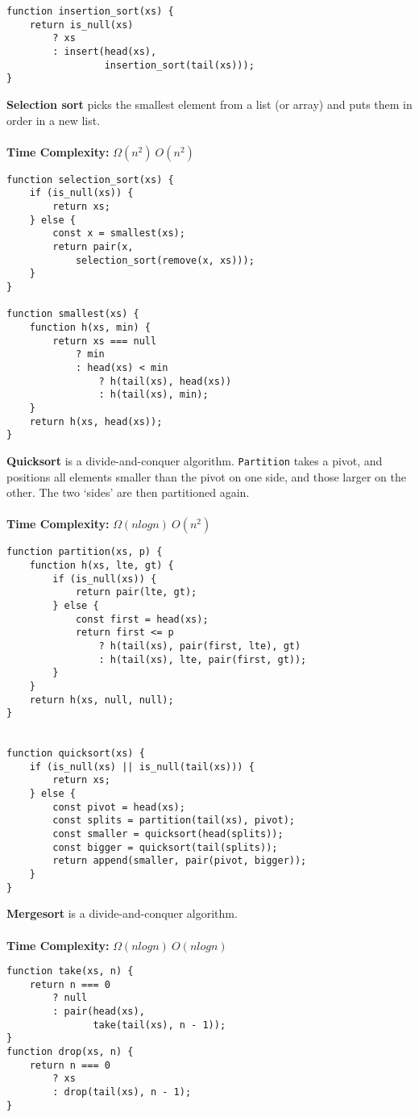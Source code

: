 \documentclass[a4paper]{article} \usepackage[backend=biber, style=numeric, sorting=none]{biblatex}
\begin{document}
\begin{multicols*}{4}
\begin{verbatim}
function insertion_sort(xs) {
    return is_null(xs)
        ? xs
        : insert(head(xs),
                 insertion_sort(tail(xs)));
}
\end{verbatim}

{\small\textbf{Selection sort}} picks the smallest element from a list (or array) and puts them in order in a new list.
\\ \\
\textbf{Time Complexity:} $\Omega(n^{2})\ O(n^{2})$
\begin{verbatim}
function selection_sort(xs) {
    if (is_null(xs)) {
        return xs;
    } else {
        const x = smallest(xs);
        return pair(x,
            selection_sort(remove(x, xs)));
    }
}

function smallest(xs) {
    function h(xs, min) {
        return xs === null
            ? min
            : head(xs) < min
                ? h(tail(xs), head(xs))
                : h(tail(xs), min);
    }
    return h(xs, head(xs));
}
\end{verbatim}
\vfill\null
\columnbreak
{\small\textbf{Quicksort}} is a divide-and-conquer algorithm. \texttt{Partition} takes a pivot, and positions all elements smaller than the pivot on one side, and those larger on the other. The two `sides' are then partitioned again.
\\ \\
\textbf{Time Complexity:} $\Omega(n log n)\ O(n^{2})$
\begin{verbatim}
function partition(xs, p) {
    function h(xs, lte, gt) {
        if (is_null(xs)) {
            return pair(lte, gt);
        } else {
            const first = head(xs);
            return first <= p
                ? h(tail(xs), pair(first, lte), gt)
                : h(tail(xs), lte, pair(first, gt));
        }
    }
    return h(xs, null, null);
}


function quicksort(xs) {
    if (is_null(xs) || is_null(tail(xs))) {
        return xs;
    } else {
        const pivot = head(xs);
        const splits = partition(tail(xs), pivot);
        const smaller = quicksort(head(splits));
        const bigger = quicksort(tail(splits));
        return append(smaller, pair(pivot, bigger));
    }
}
\end{verbatim}
{\small\textbf{Mergesort}} is a divide-and-conquer algorithm.
\\ \\
\textbf{Time Complexity:} $\Omega(n log n)\ O(n log n)$
\begin{verbatim}
function take(xs, n) {
    return n === 0
        ? null
        : pair(head(xs),
               take(tail(xs), n - 1));
}
function drop(xs, n) {
    return n === 0
        ? xs
        : drop(tail(xs), n - 1);
}


\end{verbatim}
\end{multicols*}
\end{document}
